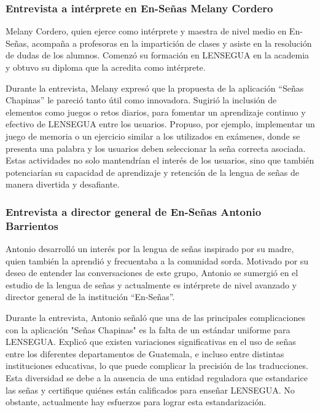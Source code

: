 \subsubsection{Entrevista a intérprete en En-Señas Melany Cordero}

Melany Cordero, quien ejerce como intérprete y maestra de nivel medio en En-Señas, acompaña a profesoras en la impartición de clases y asiste en la resolución de dudas de los alumnos. Comenzó su formación en LENSEGUA en la academia y obtuvo su diploma que la acredita como intérprete.

Durante la entrevista, Melany expresó que la propuesta de la aplicación ``Señas Chapinas'' le pareció tanto útil como innovadora. Sugirió la inclusión de elementos como juegos o retos diarios, para fomentar un aprendizaje continuo y efectivo de LENSEGUA entre los usuarios. Propuso, por ejemplo, implementar un juego de memoria o un ejercicio similar a los utilizados en exámenes, donde se presenta una palabra y los usuarios deben seleccionar la seña correcta asociada. Estas actividades no solo mantendrían el interés de los usuarios, sino que también potenciarían su capacidad de aprendizaje y retención de la lengua de señas de manera divertida y desafiante.


\subsubsection{Entrevista a director general de En-Señas Antonio Barrientos}

Antonio desarrolló un interés por la lengua de señas inspirado por su madre, quien también la aprendió y frecuentaba a la comunidad sorda. Motivado por su deseo de entender las conversaciones de este grupo, Antonio se sumergió en el estudio de la lengua de señas y actualmente es intérprete de nivel avanzado y director general de la institución ``En-Señas''.

Durante la entrevista, Antonio señaló que una de las principales complicaciones con la aplicación "Señas Chapinas" es la falta de un estándar uniforme para LENSEGUA. Explicó que existen variaciones significativas en el uso de señas entre los diferentes departamentos de Guatemala, e incluso entre distintas instituciones educativas, lo que puede complicar la precisión de las traducciones. Esta diversidad se debe a la ausencia de una entidad reguladora que estandarice las señas y certifique quiénes están calificados para enseñar LENSEGUA. No obstante, actualmente hay esfuerzos para lograr esta estandarización.

